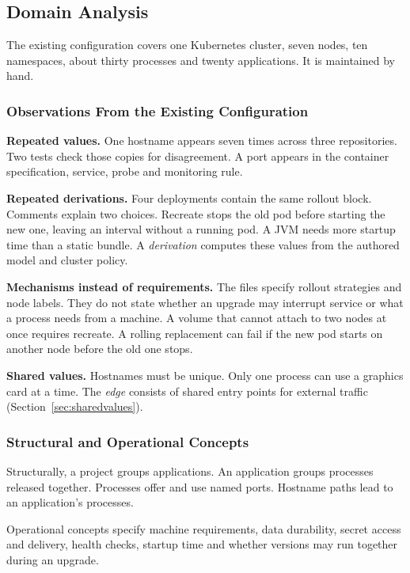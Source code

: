 \subsection{Domain Analysis}
\label{sec:domainanalysis}

The existing configuration covers one Kubernetes cluster, seven nodes, ten
namespaces, about thirty processes and twenty applications. It is maintained by
hand.

\subsubsection{Observations From the Existing Configuration}
\label{sec:observations}

\textbf{Repeated values.} One hostname appears seven times across three
repositories. Two tests check those copies for disagreement. A port appears in
the container specification, service, probe and monitoring rule.

\textbf{Repeated derivations.} Four deployments contain the same rollout block.
Comments explain two choices. Recreate stops the old pod before starting the
new one, leaving an interval without a running pod. A JVM needs more startup
time than a static bundle. A \emph{derivation} computes these values from the
authored model and cluster policy.

\textbf{Mechanisms instead of requirements.} The files specify rollout strategies
and node labels. They do not state whether an upgrade may interrupt service or
what a process needs from a machine. A volume that cannot attach to two nodes
at once requires recreate. A rolling replacement can fail if the new pod starts
on another node before the old one stops.

\textbf{Shared values.} Hostnames must be unique. Only one process can use a
graphics card at a time. The \emph{edge} consists of shared entry points for
external traffic (Section~\ref{sec:sharedvalues}).

\subsubsection{Structural and Operational Concepts}

Structurally, a project groups applications. An application groups processes
released together. Processes offer and use named ports. Hostname paths lead to
an application's processes.

Operational concepts specify machine requirements, data durability, secret
access and delivery, health checks, startup time and whether versions may run
together during an upgrade.
